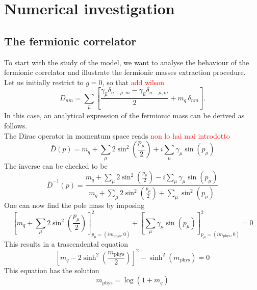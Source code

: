 \chapter{Numerical investigation}
\label{chapt:results}


\section{The fermionic correlator}
To start with the study of the model, we want to analyse the behaviour of the fermionic correlator and illustrate the fermionic masses extraction procedure. \\
Let us initially restrict to $g = 0$, so that \textcolor{red}{add wilson}
\begin{equation*}
    D_{n m}=\sum_{\hat\mu}\left[\frac{\gamma_{\hat\mu}\delta_{n+\hat\mu, m} - \gamma_{\hat\mu} \delta_{n-\hat\mu, m}}{2} + m_q \, \delta_{n m}\right] .
\end{equation*}
In this case, an analytical expression of the fermionic mass can be derived as follows. \\
The Dirac operator in momentum space reads \textcolor{red}{non lo hai mai introdotto}
\begin{equation*}
\bar{D}(p)= m_q + \sum_\mu 2 \sin ^2\left(\frac{p_\mu}{2}\right)+i \sum_\mu \gamma_\mu \sin \left(p_\mu\right)
\end{equation*}
The inverse can be checked to be 
\begin{equation*}
    \bar{D}^{-1}(p) = \frac{m_q + \sum_\mu 2 \sin ^2\left(\frac{p_\mu}{2}\right) - i \sum_\mu \gamma_\mu \sin \left(p_\mu\right)}{m_q + \sum_\mu 2 \sin^2\left(\frac{p_\mu}{2}\right) + \sum_\mu \sin^2 \left(p_\mu\right)}
\end{equation*}
One can now find the pole mass by imposing 
\begin{equation*}
    \left[m_q + \sum_\mu 2 \sin ^2\left(\frac{p_\mu}{2}\right)\right]^2_{p_\mu = (im_\text{phys}, 0)} + \left[\sum_\mu \gamma_\mu \sin \left(p_\mu\right)\right]^2_{p_\mu = (im_\text{phys}, 0)} = 0
\end{equation*}
This results in a trascendental equation 
\begin{equation*}
    \left[m_q - 2 \sinh^2\left(\frac{m_\text{phys}}{2}\right)\right]^2 - \sinh^2\left(m_\text{phys}\right) = 0
\end{equation*}
This equation has the solution 
\begin{equation*}
    m_\text{phys} = \log\left(1+m_q\right)
\end{equation*}
